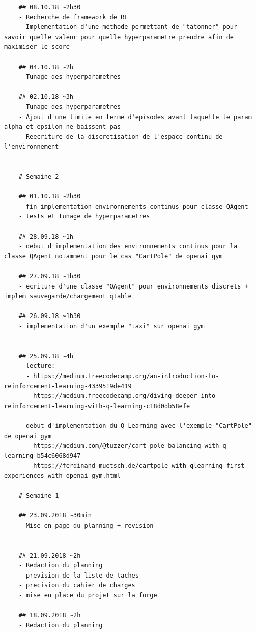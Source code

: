 \documentclass[a4paper,10pt,openany,oneside]{report}
\begin{document}
\begin{lstlisting}
	## 08.10.18 ~2h30
	- Recherche de framework de RL
	- Implementation d'une methode permettant de "tatonner" pour savoir quelle valeur pour quelle hyperparametre prendre afin de maximiser le score
	
	## 04.10.18 ~2h
	- Tunage des hyperparametres
	
	## 02.10.18 ~3h
	- Tunage des hyperparametres
	- Ajout d'une limite en terme d'episodes avant laquelle le param alpha et epsilon ne baissent pas
	- Reecriture de la discretisation de l'espace continu de l'environnement
	
	
	# Semaine 2
	
	## 01.10.18 ~2h30
	- fin implementation environnements continus pour classe QAgent
	- tests et tunage de hyperparametres
	
	## 28.09.18 ~1h
	- debut d'implementation des environnements continus pour la classe QAgent notamment pour le cas "CartPole" de openai gym
	
	## 27.09.18 ~1h30
	- ecriture d'une classe "QAgent" pour environnements discrets + implem sauvegarde/chargement qtable
	
	## 26.09.18 ~1h30
	- implementation d'un exemple "taxi" sur openai gym
	
	
	## 25.09.18 ~4h
	- lecture:
	  - https://medium.freecodecamp.org/an-introduction-to-reinforcement-learning-4339519de419
	  - https://medium.freecodecamp.org/diving-deeper-into-reinforcement-learning-with-q-learning-c18d0db58efe
	
	- debut d'implementation du Q-Learning avec l'exemple "CartPole" de openai gym
	  - https://medium.com/@tuzzer/cart-pole-balancing-with-q-learning-b54c6068d947
	  - https://ferdinand-muetsch.de/cartpole-with-qlearning-first-experiences-with-openai-gym.html
	
	# Semaine 1
	
	## 23.09.2018 ~30min
	- Mise en page du planning + revision
	
	
	## 21.09.2018 ~2h
	- Redaction du planning
	- prevision de la liste de taches
	- precision du cahier de charges
	- mise en place du projet sur la forge
	
	## 18.09.2018 ~2h
	- Redaction du planning
	

\end{lstlisting}
\thispagestyle{headings}
\clearpage
\thispagestyle{headings}


\clearpage
\thispagestyle{headings}
\listoffigures
\end{document}
